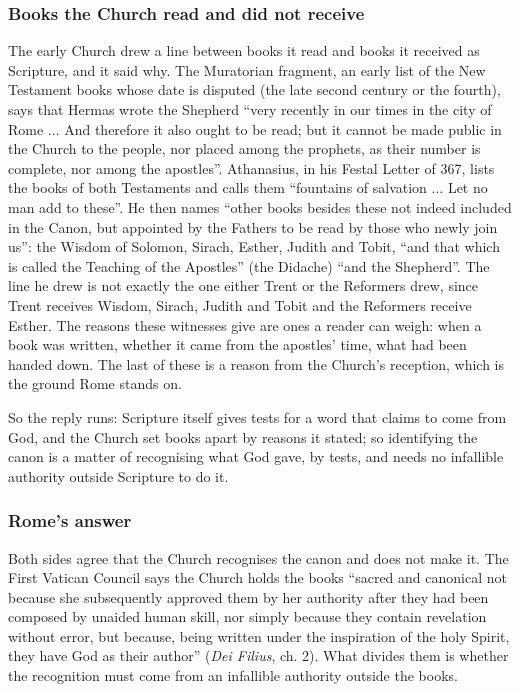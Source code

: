 \documentclass[11pt]{article}
\begin{document}
\subsubsection*{Books the Church read and did not receive}
The early Church drew a line between books it read and books it received as Scripture, and it said why. The Muratorian fragment, an early list of the New Testament books whose date is disputed (the late second century or the fourth), says that Hermas wrote the Shepherd “very recently in our times in the city of Rome ... And therefore it also ought to be read; but it cannot be made public in the Church to the people, nor placed among the prophets, as their number is complete, nor among the apostles”. Athanasius, in his Festal Letter of 367, lists the books of both Testaments and calls them “fountains of salvation ... Let no man add to these”. He then names “other books besides these not indeed included in the Canon, but appointed by the Fathers to be read by those who newly join us”: the Wisdom of Solomon, Sirach, Esther, Judith and Tobit, “and that which is called the Teaching of the Apostles” (the Didache) “and the Shepherd”. The line he drew is not exactly the one either Trent or the Reformers drew, since Trent receives Wisdom, Sirach, Judith and Tobit and the Reformers receive Esther. The reasons these witnesses give are ones a reader can weigh: when a book was written, whether it came from the apostles’ time, what had been handed down. The last of these is a reason from the Church’s reception, which is the ground Rome stands on.

So the reply runs: Scripture itself gives tests for a word that claims to come from God, and the Church set books apart by reasons it stated; so identifying the canon is a matter of recognising what God gave, by tests, and needs no infallible authority outside Scripture to do it.

\subsubsection*{Rome’s answer}
Both sides agree that the Church recognises the canon and does not make it. The First Vatican Council says the Church holds the books “sacred and canonical not because she subsequently approved them by her authority after they had been composed by unaided human skill, nor simply because they contain revelation without error, but because, being written under the inspiration of the holy Spirit, they have God as their author” (\emph{Dei Filius}, ch. 2). What divides them is whether the recognition must come from an infallible authority outside the books.
\end{document}
